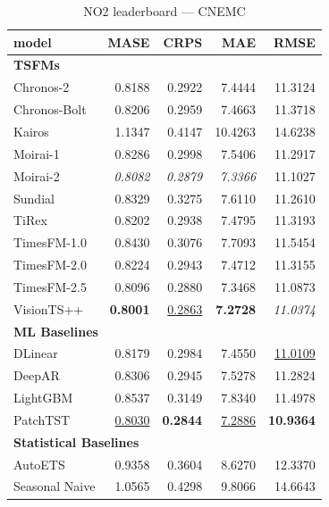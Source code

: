 \begin{table}[H]
\caption{NO2 leaderboard --- CNEMC}
\centering
\begin{small}
\begin{tabular}{lrrrr}
\toprule
model & MASE & CRPS & MAE & RMSE \\
\midrule
\multicolumn{5}{l}{\textbf{TSFMs}} \\
Chronos-2 & 0.8188 & 0.2922 & 7.4444 & 11.3124 \\
Chronos-Bolt & 0.8206 & 0.2959 & 7.4663 & 11.3718 \\
Kairos & 1.1347 & 0.4147 & 10.4263 & 14.6238 \\
Moirai-1 & 0.8286 & 0.2998 & 7.5406 & 11.2917 \\
Moirai-2 & \textit{0.8082} & \textit{0.2879} & \textit{7.3366} & 11.1027 \\
Sundial & 0.8329 & 0.3275 & 7.6110 & 11.2610 \\
TiRex & 0.8202 & 0.2938 & 7.4795 & 11.3193 \\
TimesFM-1.0 & 0.8430 & 0.3076 & 7.7093 & 11.5454 \\
TimesFM-2.0 & 0.8224 & 0.2943 & 7.4712 & 11.3155 \\
TimesFM-2.5 & 0.8096 & 0.2880 & 7.3468 & 11.0873 \\
VisionTS++ & \textbf{0.8001} & \underline{0.2863} & \textbf{7.2728} & \textit{11.0374} \\
\midrule
\multicolumn{5}{l}{\textbf{ML Baselines}} \\
DLinear & 0.8179 & 0.2984 & 7.4550 & \underline{11.0109} \\
DeepAR & 0.8306 & 0.2945 & 7.5278 & 11.2824 \\
LightGBM & 0.8537 & 0.3149 & 7.8340 & 11.4978 \\
PatchTST & \underline{0.8030} & \textbf{0.2844} & \underline{7.2886} & \textbf{10.9364} \\
\midrule
\multicolumn{5}{l}{\textbf{Statistical Baselines}} \\
AutoETS & 0.9358 & 0.3604 & 8.6270 & 12.3370 \\
Seasonal Naive & 1.0565 & 0.4298 & 9.8066 & 14.6643 \\
\bottomrule
\end{tabular}
\end{small}
\end{table}